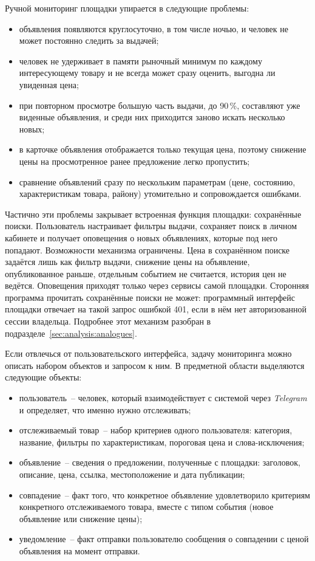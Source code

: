 Ручной мониторинг площадки упирается в следующие проблемы:
\begin{itemize}
	\item объявления появляются круглосуточно, в том числе ночью, и человек не может постоянно следить за выдачей;
	\item человек не удерживает в памяти рыночный минимум по каждому интересующему товару и не всегда может сразу оценить, выгодна ли увиденная цена;
	\item при повторном просмотре большую часть выдачи, до 90\,\%, составляют уже виденные объявления, и среди них приходится заново искать несколько новых;
	\item в карточке объявления отображается только текущая цена, поэтому снижение цены на просмотренное ранее предложение легко пропустить;
	\item сравнение объявлений сразу по нескольким параметрам (цене, состоянию, характеристикам товара, району) утомительно и сопровождается ошибками.
\end{itemize}

Частично эти проблемы закрывает встроенная функция площадки: сохранённые поиски. Пользователь настраивает фильтры выдачи, сохраняет поиск в личном кабинете и получает оповещения о новых объявлениях, которые под него попадают. Возможности механизма ограничены. Цена в сохранённом поиске задаётся лишь как фильтр выдачи, снижение цены на объявление, опубликованное раньше, отдельным событием не считается, история цен не ведётся. Оповещения приходят только через сервисы самой площадки. Сторонняя программа прочитать сохранённые поиски не может: программный интерфейс площадки отвечает на такой запрос ошибкой 401, если в нём нет авторизованной сессии владельца. Подробнее этот механизм разобран в подразделе~\ref{sec:analysis:analogues}.

Если отвлечься от пользовательского интерфейса, задачу мониторинга можно описать набором объектов и запросом к ним. В предметной области выделяются следующие объекты:
\begin{itemize}
	\item пользователь~-- человек, который взаимодействует с системой через \textit{Telegram} и определяет, что именно нужно отслеживать;
	\item отслеживаемый товар~-- набор критериев одного пользователя: категория, название, фильтры по характеристикам, пороговая цена и слова-исключения;
	\item объявление~-- сведения о предложении, полученные с площадки: заголовок, описание, цена, ссылка, местоположение и дата публикации;
	\item совпадение~-- факт того, что конкретное объявление удовлетворило критериям конкретного отслеживаемого товара, вместе с типом события (новое объявление или снижение цены);
	\item уведомление~-- факт отправки пользователю сообщения о совпадении с ценой объявления на момент отправки.
\end{itemize}

